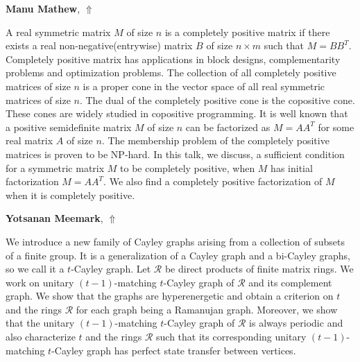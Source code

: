 \documentclass[ILAS2025-program.tex]{subfiles}
\begin{document}
\hypertarget{down0097}{}\begin{ilasabstract}
    
\textbf{Manu Mathew},  \hfill \hyperlink{up0097}{$\Uparrow$}
    
    
\mtskip
    A real symmetric matrix $M$ of size $n$ is a completely positive matrix if there exists a real non-negative(entrywise) matrix $B$ of size $n\times m$ such that $M=BB^T$. Completely positive matrix has applications in block designs, complementarity problems and optimization problems. The collection of all completely positive matrices of size $n$  is a proper cone in the vector space of all real symmetric matrices of size $n$. The dual of the completely positive cone is the copositive cone. These cones are widely studied in copositive programming. It is well known that a positive semidefinite matrix $M$ of size $n$ can be factorized as $M=AA^T$ for some real matrix $A$ of size $n$. The membership problem of the completely positive matrices is proven to be NP-hard. In this talk, we discuss, a sufficient condition for a symmetric matrix $M$ to be completely positive, when $M$ has initial factorization $M=AA^T$. We also find a completely positive factorization of $M$ when it is completely positive.
\end{ilasabstract}
    

\hypertarget{down0080}{}\begin{ilasabstract}
    
\textbf{Yotsanan Meemark},  \hfill \hyperlink{up0080}{$\Uparrow$}
    
    
\mtskip
    We introduce a new family of Cayley graphs arising from a collection of subsets of a finite group. It is a generalization of a Cayley graph and a bi-Cayley  graphs, so we call it a $t$-Cayley graph. Let ${\mathcal{R}}$ be direct products of finite matrix rings.
 We work on  unitary $(t-1)$-matching $t$-Cayley graph of ${\mathcal{R}}$ and its complement graph. We show that the graphs are hyperenergetic and obtain a criterion on $t$ and the rings ${\mathcal{R}}$ for each graph being a Ramanujan graph.  Moreover, we show that the unitary $(t-1)$-matching $t$-Cayley graph of ${\mathcal{R}}$ is always periodic and also
  characterize $t$ and the rings ${\mathcal{R}}$ such that its corresponding unitary $(t-1)$-matching $t$-Cayley graph has perfect state transfer between vertices.
\end{ilasabstract}
    
\end{document}
